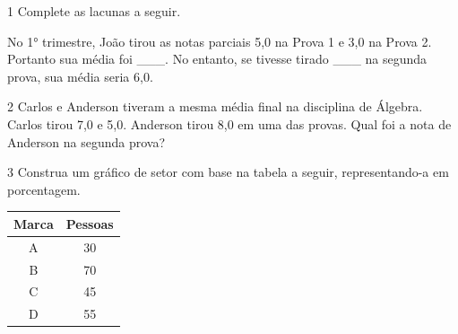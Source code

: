 \begin{escolha}
\begin{escolha}
\begin{escolha}
\begin{escolha}
{\begin{boxmedio}
\begin{boxpeq}
\begin{q°}
\begin{boxmedio}
\begin{boxpeq}
\begin{boxpeq}
\begin{boxmedio}
\begin{boxmedio}
\begin{boxmedio}
\num{1} Complete as lacunas a seguir.

No 1° trimestre, João tirou as notas parciais 5,0 na Prova 1 e 3,0 na
Prova 2. Portanto sua média foi \_\_\_. No entanto, se tivesse tirado
\_\_\_ na segunda prova, sua média seria 6,0.



\num{2} Carlos e Anderson tiveram a mesma média final na disciplina de Álgebra.
Carlos tirou 7,0 e 5,0. Anderson tirou 8,0 em uma das provas. Qual foi a nota 
de Anderson na segunda prova?




\num{3} Construa um gráfico de setor com base na tabela a seguir,
representando-a em porcentagem.

\begin{table}[]
\begin{tabular}{|c|c|}
\hline
\rowcolor[HTML]{DAE8FC} 
\textbf{Marca} & \textbf{Pessoas} \\ \hline
A & 30 \\ \hline
B & 70 \\ \hline
C & 45 \\ \hline
D & 55 \\ \hline
\end{tabular}
\end{table}

\begin{largebox}



\end{largebox}
\end{boxmedio}
\end{boxmedio}
\end{boxmedio}
\end{boxpeq}
\end{boxpeq}
\end{boxmedio}
\end{q°}
\end{boxpeq}
\end{boxmedio}}
\end{escolha}
\end{escolha}
\end{escolha}
\end{escolha}

